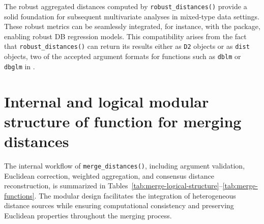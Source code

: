 The robust aggregated distances computed by \texttt{robust\_distances()} provide a solid foundation for subsequent multivariate analyses in mixed-type data settings. These robust metrics can be seamlessly integrated, for instance, with the  package, enabling robust DB regression models. This compatibility arises from the fact that \texttt{robust\_distances()} can return its results either as \texttt{D2} objects or as \texttt{dist} objects, two of the accepted argument formats for functions such as \texttt{dblm} or \texttt{dbglm} in .

\section{Internal and logical modular structure
of function for merging distances}
\label{AppMergeDistances}

The internal workflow of \texttt{merge\_distances()}, including argument validation, Euclidean correction, weighted aggregation, and consensus distance reconstruction, is summarized in Tables~\ref{tab:merge-logical-structure}--\ref{tab:merge-functions}. The modular design facilitates the integration of heterogeneous distance sources while ensuring computational consistency and preserving Euclidean properties throughout the merging process.

